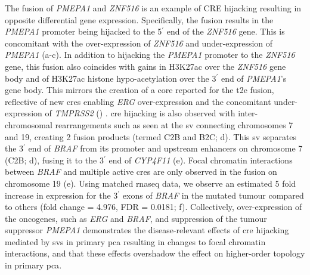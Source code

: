 The fusion of \emph{PMEPA1} and \emph{ZNF516} is an example of CRE hijacking resulting in opposite differential gene expression.
Specifically, the fusion results in the \emph{PMEPA1} promoter being hijacked to the 5$^\prime$ end of the \emph{ZNF516} gene.
This is concomitant with the over-expression of \emph{ZNF516} and under-expression of \emph{PMEPA1} (a-c).
In addition to hijacking the \emph{PMEPA1} promoter to the \emph{ZNF516} gene, this fusion also coincides with gains in H3K27ac over the \emph{ZNF516} gene body and of H3K27ac histone hypo-acetylation over the 3$^\prime$ end of \emph{PMEPA1}'s gene body.
This mirrors the creation of a \gls{core} reported for the \gls{t2e} fusion, reflective of new \glspl{cre} enabling \emph{ERG} over-expression and the concomitant under-expression of \emph{TMPRSS2} () \cite{kronTMPRSS2ERGFusion2017,tomlinsRecurrentFusionTMPRSS22005,tomlinsDistinctClassesChromosomal2007}.
\Gls{cre} hijacking is also observed with inter-chromosomal rearrangements such as seen at the \gls{sv} connecting chromosomes 7 and 19, creating 2 fusion products (termed C2B and B2C; d).
This \gls{sv} separates the 3$^\prime$ end of \emph{BRAF} from its promoter and upstream enhancers on chromosome 7 (C2B; d), fusing it to the 3$^\prime$ end of \emph{CYP4F11} (e).
Focal chromatin interactions between \emph{BRAF} and multiple active \glspl{cre} are only observed in the fusion on chromosome 19 (e).
Using matched \gls{rnaseq} data, we observe an estimated 5 fold increase in expression for the 3$^\prime$ exons of \emph{BRAF} in the mutated tumour compared to others (fold change = 4.976, FDR = 0.0181; f).
Collectively, over-expression of the oncogenes, such as \emph{ERG} and \emph{BRAF}, and suppression of the tumour suppressor \emph{PMEPA1} demonstrates the disease-relevant effects of \gls{cre} hijacking mediated by \glspl{sv} in primary \gls{pca} resulting in changes to focal chromatin interactions, and that these effects overshadow the effect on higher-order topology in primary \gls{pca}.

